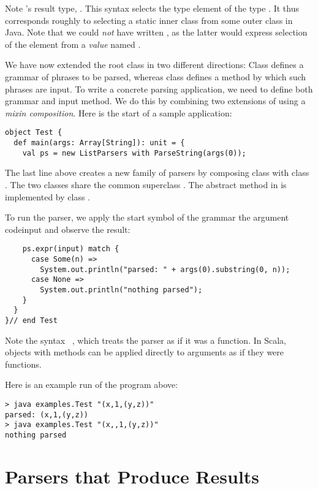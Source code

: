 {Note 's result type, . This syntax
selects the type element  of the type . It
thus corresponds roughly to selecting a static inner class from some
outer class in Java. Note that we could {\em not} have written
, as the latter would express selection of the
 element from a {\em value} named .

We have now extended the root class  in two different
directions: Class  defines a grammar of phrases to
be parsed, whereas class  defines a method by which
such phrases are input. To write a concrete parsing application, we
need to define both grammar and input method. We do this by combining
two extensions of  using a {\em mixin composition}.
Here is the start of a sample application:
\begin{lstlisting}
object Test {
  def main(args: Array[String]): unit = {
    val ps = new ListParsers with ParseString(args(0));
\end{lstlisting}
The last line above creates a new family of parsers by composing class
 with class . The two classes
share the common superclass . The abstract method
 in  is implemented by class .

To run the parser, we apply the start symbol of the grammar
 the argument code{input} and observe the result:
\begin{lstlisting}
    ps.expr(input) match { 
      case Some(n) => 
        System.out.println("parsed: " + args(0).substring(0, n)); 
      case None =>
        System.out.println("nothing parsed"); 
    }
  }
}// end Test
\end{lstlisting}
Note the syntax ~, which treats the 
parser as if it was a function. In Scala, objects with 
methods can be applied directly to arguments as if they were functions.

Here is an example run of the program above:
\begin{lstlisting}
> java examples.Test "(x,1,(y,z))"
parsed: (x,1,(y,z))
> java examples.Test "(x,,1,(y,z))"
nothing parsed
\end{lstlisting}

\section{\label{sec:parsers-results}Parsers that Produce Results}

}
